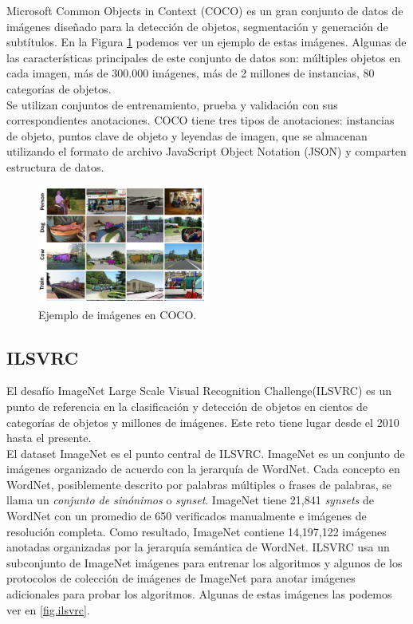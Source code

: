 \documentclass{bmvc2k}
\begin{document}
Microsoft Common Objects in Context (COCO) es un gran conjunto de datos de imágenes diseñado para la detección de objetos, segmentación y generación de subtítulos. En la Figura \ref{fig.coco} podemos ver un ejemplo de estas imágenes. Algunas de las características principales de este conjunto de datos son: múltiples objetos en cada imagen, más de 300.000 imágenes, más de 2 millones de instancias, 80 categorías de objetos.\\

Se utilizan conjuntos de entrenamiento, prueba y validación con sus correspondientes anotaciones. COCO tiene tres tipos de anotaciones: instancias de objeto, puntos clave de objeto y leyendas de imagen, que se almacenan utilizando el formato de archivo JavaScript Object Notation (JSON) y comparten estructura de datos.\\

\begin{figure}
\begin{center}
	\includegraphics[width=0.5\textwidth]{images/COCO.png}
   \caption{Ejemplo de imágenes en COCO.}
	\label{fig.coco}
\end{center}
\end{figure}


\subsection{ILSVRC}

El desafío ImageNet Large Scale Visual Recognition Challenge(ILSVRC) es un punto de referencia en la clasificación y detección de objetos en cientos de categorías de objetos y millones de imágenes. Este reto tiene lugar desde el 2010 hasta el presente.\\

El dataset ImageNet es el punto central de ILSVRC. ImageNet es un conjunto de imágenes
organizado de acuerdo con la jerarquía de WordNet. Cada concepto en WordNet, posiblemente descrito por palabras múltiples o frases de palabras, se llama un \textit{conjunto de sinónimos} o \textit{synset}. ImageNet tiene 21,841 \textit{synsets} de WordNet con un promedio de 650 verificados manualmente e imágenes de resolución completa. Como resultado, ImageNet contiene 14,197,122 imágenes anotadas organizadas por la jerarquía semántica de WordNet. ILSVRC usa un subconjunto de ImageNet imágenes para entrenar los algoritmos y algunos de los protocolos de colección de imágenes de ImageNet para anotar imágenes adicionales para probar los algoritmos. Algunas de estas imágenes las podemos ver en \ref{fig.ilsvrc}. \\
\end{document}
